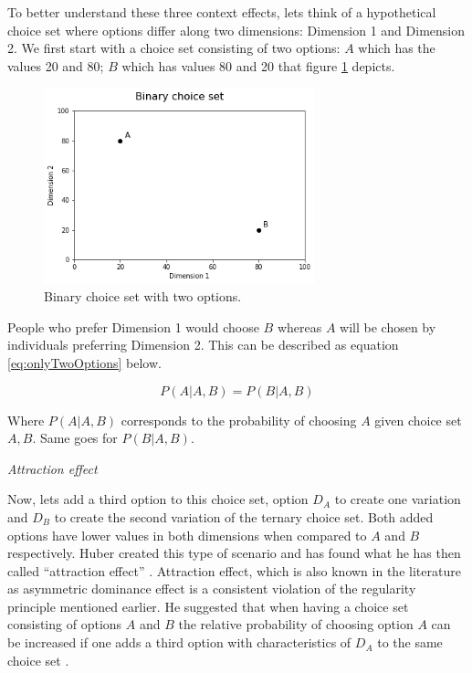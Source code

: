 \documentclass[a4paper,12pt]{article}
\newcommand{\citeyearonly}[1]{\citeyearpar{#1}}
\begin{document}
To better understand these three context effects, lets think of a hypothetical choice set where options differ along two dimensions: Dimension 1 and Dimension 2. We first start with a choice set consisting of two options: $A$ which has the values 20 and 80; $B$ which has values 80 and 20 that figure \ref{fig:binaryChoiseSet} depicts. 

\begin{figure}[h]
    \centering
    \includegraphics[width=0.7\textwidth]{staticFiles/noEffect.png}
    \caption{Binary choice set with two options.} %
    \label{fig:binaryChoiseSet} %

\end{figure}

People who prefer Dimension 1 would choose $B$ whereas $A$ will be chosen by individuals preferring Dimension 2. This can be described as equation \ref{eq:onlyTwoOptions} below.

\begin{equation}\label{eq:onlyTwoOptions}
    P(A|A,B) = P(B|A,B)
\end{equation}

Where $P(A|A,B)$ corresponds to the probability of choosing $A$ given choice set $A,B$. Same goes for $P(B|A,B)$.

\textit{Attraction effect}

Now, lets add a third option to this choice set, option $D_A$ to create one variation and $D_B$ to create the second variation of the ternary choice set. Both added options have lower values in both dimensions when compared to $A$ and $B$ respectively. Huber created this type of scenario and has found what he has then called ``attraction effect'' \citeyearonly{huberEtAl82}. Attraction effect, which is also known in the literature as asymmetric dominance effect is a consistent violation of the regularity principle mentioned earlier. He suggested that when having a choice set consisting of options $A$ and $B$ the relative probability of choosing option $A$ can be increased if one adds a third option with characteristics of $D_A$ to the same choice set \citeyearonly{huberEtAl82}.  
\end{document}
